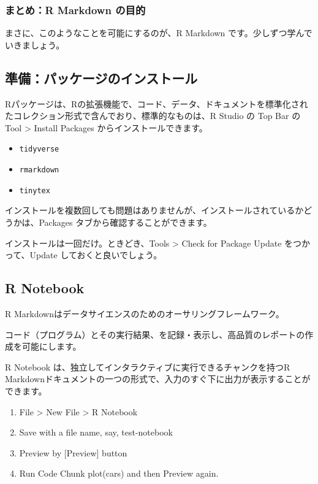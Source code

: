\documentclass[
]{bxjsbook}
\providecommand{\tightlist}{%
  \setlength{\itemsep}{0pt}\setlength{\parskip}{0pt}}
\theoremstyle{definition}
\theoremstyle{definition}
\theoremstyle{definition}
\theoremstyle{definition}
\theoremstyle{remark}
\begin{document}
\hypertarget{ux307eux3068ux3081r-markdown-ux306eux76eeux7684}{%
\subsubsection{まとめ：R Markdown の目的}\label{ux307eux3068ux3081r-markdown-ux306eux76eeux7684}}

まさに、このようなことを可能にするのが、R Markdown です。少しずつ学んでいきましょう。

\hypertarget{ux6e96ux5099ux30d1ux30c3ux30b1ux30fcux30b8ux306eux30a4ux30f3ux30b9ux30c8ux30fcux30eb}{%
\subsection{準備：パッケージのインストール}\label{ux6e96ux5099ux30d1ux30c3ux30b1ux30fcux30b8ux306eux30a4ux30f3ux30b9ux30c8ux30fcux30eb}}

Rパッケージは、Rの拡張機能で、コード、データ、ドキュメントを標準化されたコレクション形式で含んでおり、標準的なものは、R Studio の Top Bar の Tool \textgreater{} Install Packages からインストールできます。

\begin{itemize}
\tightlist
\item
  \texttt{tidyverse}
\item
  \texttt{rmarkdown}
\item
  \texttt{tinytex}
\end{itemize}

インストールを複数回しても問題はありませんが、インストールされているかどうかは、Packages タブから確認することができます。

インストールは一回だけ。ときどき、Tools \textgreater{} Check for Package Update をつかって、Update しておくと良いでしょう。

\hypertarget{r-notebook}{%
\subsection{R Notebook}\label{r-notebook}}

R Markdownはデータサイエンスのためのオーサリングフレームワーク。

コード（プログラム）とその実行結果、を記録・表示し、高品質のレポートの作成を可能にします。

R Notebook は、独立してインタラクティブに実行できるチャンクを持つR Markdownドキュメントの一つの形式で、入力のすぐ下に出力が表示することができます。

\begin{enumerate}
\def\labelenumi{\arabic{enumi}.}
\tightlist
\item
  File \textgreater{} New File \textgreater{} R Notebook
\item
  Save with a file name, say, test-notebook
\item
  Preview by {[}Preview{]} button
\item
  Run Code Chunk plot(cars) and then Preview again.
\end{enumerate}
\end{document}
